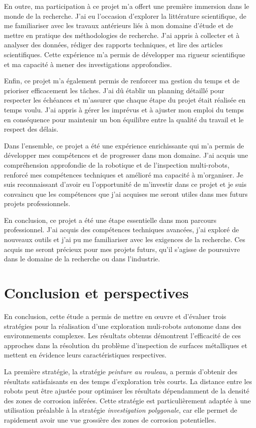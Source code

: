 \documentclass[english,RandD]{rapportPFE}  %
\begin{document}
		En outre, ma participation à ce projet m'a offert une première immersion dans le monde de la recherche.
		J'ai eu l'occasion d'explorer la littérature scientifique, de me familiariser avec les travaux antérieurs liés à mon domaine d'étude et de mettre en pratique des méthodologies de recherche.
		J'ai appris à collecter et à analyser des données, rédiger des rapports techniques, et lire des articles scientifiques.
		Cette expérience m'a permis de développer ma rigueur scientifique et ma capacité à mener des investigations approfondies.

		Enfin, ce projet m'a également permis de renforcer ma gestion du temps et de prioriser efficacement les tâches.
		J'ai dû établir un planning détaillé pour respecter les échéances et m'assurer que chaque étape du projet était réalisée en temps voulu.
		J'ai appris à gérer les imprévus et à ajuster mon emploi du temps en conséquence pour maintenir un bon équilibre entre la qualité du travail et le respect des délais.

		Dans l'ensemble, ce projet a été une expérience enrichissante qui m'a permis de développer mes compétences et de progresser dans mon domaine.
		J'ai acquis une compréhension approfondie de la robotique et de l'inspection multi-robots, renforcé mes compétences techniques et amélioré ma capacité à m'organiser.
		Je suis reconnaissant d'avoir eu l'opportunité de m'investir dans ce projet et je suis convaincu que les compétences que j'ai acquises me seront utiles dans mes futurs projets professionnels.

		En conclusion, ce projet a été une étape essentielle dans mon parcours professionnel.
		J'ai acquis des compétences techniques avancées, j'ai exploré de nouveaux outils et j'ai pu me familiariser avec les exigences de la recherche.
		Ces acquis me seront précieux pour mes projets futurs, qu'il s'agisse de poursuivre dans le domaine de la recherche ou dans l'industrie.
	\section{Conclusion et perspectives}
		En conclusion, cette étude a permis de mettre en œuvre et d'évaluer trois stratégies pour la réalisation d'une exploration muli-robots autonome dans des environnements complexes.
		Les résultats obtenus démontrent l'efficacité de ces approches dans la résolution du problème d'inspection de surfaces métalliques et mettent en évidence leurs caractéristiques respectives.

		La première stratégie, la stratégie \textit{peinture au rouleau}, a permis d'obtenir des résultats satisfaisants en des temps d'exploration très courts.
		La distance entre les robots peut être ajustée pour optimiser les résultats dépendamment de la densité des zones de corrosion inférées.
		Cette stratégie est particulièrement adaptée à une utilisation préalable à la stratégie \textit{investigation polygonale}, car elle permet de rapidement avoir une vue grossière des zones de corrosion potentielles.
\end{document}
